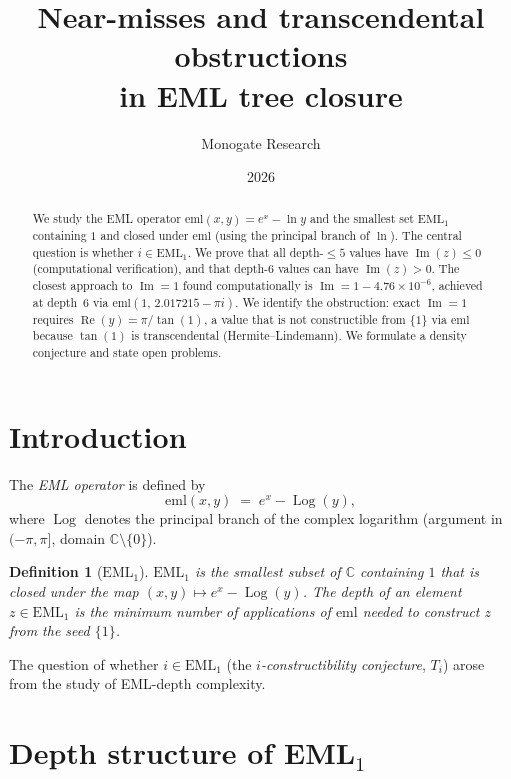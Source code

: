 \documentclass[12pt]{article}
\title{Near-misses and transcendental obstructions\\in EML tree closure}
\author{Monogate Research}
\date{2026}
\newtheorem{definition}{Definition}
\begin{document}
\maketitle

\begin{abstract}
We study the EML operator $\mathrm{eml}(x,y) = e^x - \ln y$ and the smallest set
$\mathrm{EML}_1$ containing $1$ and closed under $\mathrm{eml}$ (using the principal
branch of $\ln$). The central question is whether $i \in \mathrm{EML}_1$.
We prove that all depth-$\leq 5$ values have $\operatorname{Im}(z) \leq 0$
(computational verification), and that depth-6 values can have $\operatorname{Im}(z) > 0$.
The closest approach to $\operatorname{Im} = 1$ found computationally is
$\operatorname{Im} = 1 - 4.76 \times 10^{-6}$, achieved at depth~6 via
$\mathrm{eml}(1,\, 2.017215 - \pi i)$.
We identify the obstruction: exact $\operatorname{Im} = 1$ requires
$\operatorname{Re}(y) = \pi/\tan(1)$, a value that is not constructible from $\{1\}$
via $\mathrm{eml}$ because $\tan(1)$ is transcendental (Hermite--Lindemann).
We formulate a density conjecture and state open problems.
\end{abstract}

\section{Introduction}

The \emph{EML operator} is defined by
\[
    \mathrm{eml}(x,y) \;=\; e^x - \operatorname{Log}(y),
\]
where $\operatorname{Log}$ denotes the principal branch of the complex logarithm
(argument in $(-\pi, \pi]$, domain $\mathbb{C} \setminus \{0\}$).

\begin{definition}[$\mathrm{EML}_1$]
$\mathrm{EML}_1$ is the smallest subset of $\mathbb{C}$ containing $1$ that is
closed under the map $(x,y) \mapsto e^x - \operatorname{Log}(y)$.
The \emph{depth} of an element $z \in \mathrm{EML}_1$ is the minimum number of
applications of $\mathrm{eml}$ needed to construct $z$ from the seed $\{1\}$.
\end{definition}

The question of whether $i \in \mathrm{EML}_1$ (the \emph{$i$-constructibility
conjecture}, $T_i$) arose from the study of EML-depth complexity.

\section{Depth structure of EML\texorpdfstring{$_1$}{1}}
\end{document}
